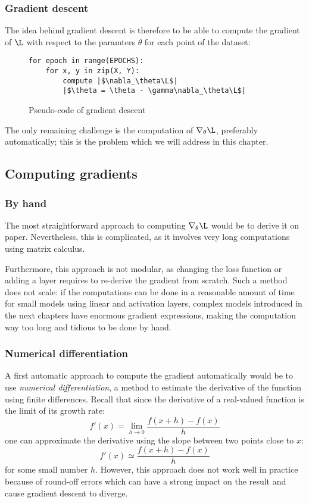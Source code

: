 \subsubsection{Gradient descent}
The idea behind gradient descent is therefore to be able to compute the gradient of $\L$ with respect to the paramters $\theta$ for each point of the dataset:
\begin{figure}[H]
    \centering
    \begin{minipage}{0.4\textwidth}
    \begin{verbatim}
for epoch in range(EPOCHS):
    for x, y in zip(X, Y):
        compute |$\nabla_\theta\L$|
        |$\theta = \theta - \gamma\nabla_\theta\L$|
    \end{verbatim}
    \end{minipage}
    \caption{Pseudo-code of gradient descent}
\end{figure}
The only remaining challenge is the computation of $\nabla_\theta\L$, preferably automatically; this is the problem which we will address in this chapter.

\subsection{Computing gradients}
\subsubsection{By hand}
The most straightforward approach to computing $\nabla_\theta\L$ would be to derive it on paper. Nevertheless, this is complicated, as it involves very long computations using matrix calculus.

Furthermore, this approach is not modular, as changing the loss function or adding a layer requires to re-derive the gradient from scratch. Such a method does not scale: if the computations can be done in a reasonable amount of time for small models using linear and activation layers, complex models introduced in the next chapters have enormous gradient expressions, making the computation way too long and tidious to be done by hand.

\subsubsection{Numerical differentiation}
A first automatic approach to compute the gradient automatically would be to use \emph{numerical differentiation}, a method to estimate the derivative of the function using finite differences. Recall that since the derivative of a real-valued function is the limit of its growth rate:
\begin{equation*}
    f'(x) = \lim_{h\to0} \frac{f(x+h)-f(x)}{h}
\end{equation*}
one can approximate the derivative using the slope between two points close to $x$:
\begin{equation*}
    f'(x) \simeq \frac{f(x+h)-f(x)}{h}
\end{equation*}
for some small number $h$. However, this approach does not work well in practice because of round-off errors which can have a strong impact on the result and cause gradient descent to diverge.

